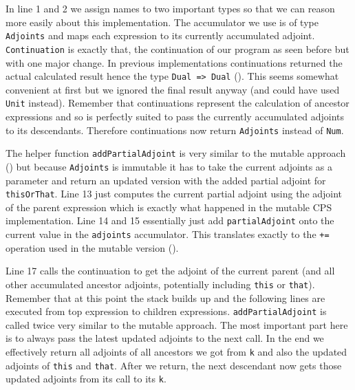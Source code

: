 In line 1 and 2 we assign names to two important types so that we can reason more easily about this implementation. The accumulator we use is of type \lstinline{Adjoints} and maps each expression to its currently accumulated adjoint. \lstinline{Continuation} is exactly that, the continuation of our program as seen before but with one major change. In previous implementations continuations returned the actual calculated result hence the type \lstinline{Dual => Dual} (). This seems somewhat convenient at first but we ignored the final result anyway (and could have used \lstinline{Unit} instead). Remember that continuations represent the calculation of ancestor expressions and so is perfectly suited to pass the currently accumulated adjoints to its descendants. Therefore continuations now return \lstinline{Adjoints} instead of \lstinline{Num}. 

The helper function \lstinline{addPartialAdjoint} is very similar to the mutable approach () but because \lstinline{Adjoints} is immutable it has to take the current adjoints as a parameter and return an updated version with the added partial adjoint for \lstinline{thisOrThat}. Line 13 just computes the current partial adjoint using the adjoint of the parent expression which is exactly what happened in the mutable CPS implementation. Line 14 and 15 essentially just add \lstinline{partialAdjoint} onto the current value in the \lstinline{adjoints} accumulator. This translates exactly to the \lstinline{+=} operation used in the mutable version ().

Line 17 calls the continuation to get the adjoint of the current parent (and all other accumulated ancestor adjoints, potentially including \lstinline{this} or \lstinline{that}). Remember that at this point the stack builds up and the following lines are executed from top expression to children expressions. \lstinline{addPartialAdjoint} is called twice very similar to the mutable approach. The most important part here is to always pass the latest updated adjoints to the next call. In the end we effectively return all adjoints of all ancestors we got from \lstinline{k} and also the updated adjoints of \lstinline{this} and \lstinline{that}. After we return, the next descendant now gets those updated adjoints from its call to its \lstinline{k}.

